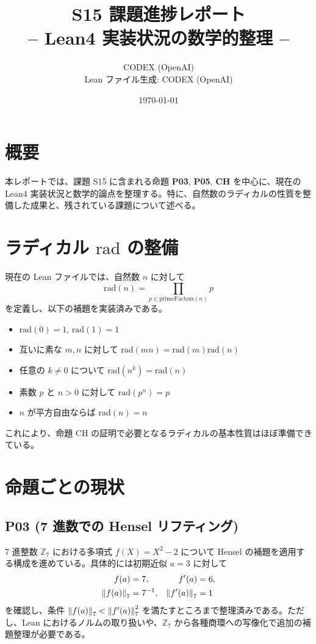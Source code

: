 \documentclass[12pt]{ltjsarticle}
\title{S15 課題進捗レポート\\\large -- Lean4 実装状況の数学的整理 --}
\author{CODEX (OpenAI)\\Lean ファイル生成: CODEX (OpenAI)}
\date{\today}
\begin{document}
\maketitle

\section*{概要}
本レポートでは、課題 S15 に含まれる命題 \textbf{P03}, \textbf{P05}, \textbf{CH} を中心に、現在の Lean4 実装状況と数学的論点を整理する。特に、自然数のラディカルの性質を整備した成果と、残されている課題について述べる。

\section{ラディカル \texorpdfstring{$\mathrm{rad}$}{rad} の整備}
現在の Lean ファイルでは、自然数 \( n \) に対して
\[
  \mathrm{rad}(n) = \prod_{p \in \mathrm{primeFactors}(n)} p
\]
を定義し、以下の補題を実装済みである。
\begin{itemize}[leftmargin=2em]
  \item \( \mathrm{rad}(0) = 1 \), \( \mathrm{rad}(1) = 1 \)
  \item 互いに素な \( m, n \) に対して \( \mathrm{rad}(mn) = \mathrm{rad}(m)\mathrm{rad}(n) \)
  \item 任意の \( k \neq 0 \) について \( \mathrm{rad}(n^k) = \mathrm{rad}(n) \)
  \item 素数 \( p \) と \( n>0 \) に対して \( \mathrm{rad}(p^n) = p \)
  \item \( n \) が平方自由ならば \( \mathrm{rad}(n) = n \)
\end{itemize}
これにより、命題 CH の証明で必要となるラディカルの基本性質はほぼ準備できている。

\section{命題ごとの現状}
\subsection*{P03 (7 進数での Hensel リフティング)}
7 進整数 \( \mathbb{Z}_7 \) における多項式 \( f(X)=X^2-2 \) について Hensel の補題を適用する構成を進めている。具体的には初期近似 \( a=3 \) に対して
\begin{align*}
  f(a) &= 7, & f'(a) &= 6,\\
  \norm{f(a)}_7 &= 7^{-1}, & \norm{f'(a)}_7 &= 1
\end{align*}
を確認し、条件 \( \norm{f(a)}_7 < \norm{f'(a)}_7^2 \) を満たすところまで整理済みである。ただし、Lean におけるノルムの取り扱いや、$\mathbb{Z}_7$ から各種商環への写像化で追加の補題整理が必要である。
\end{document}
